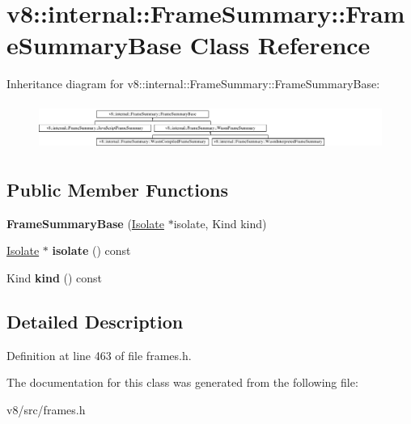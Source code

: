 \hypertarget{classv8_1_1internal_1_1FrameSummary_1_1FrameSummaryBase}{}\section{v8\+:\+:internal\+:\+:Frame\+Summary\+:\+:Frame\+Summary\+Base Class Reference}
\label{classv8_1_1internal_1_1FrameSummary_1_1FrameSummaryBase}
Inheritance diagram for v8\+:\+:internal\+:\+:Frame\+Summary\+:\+:Frame\+Summary\+Base\+:\begin{figure}[H]
\begin{center}
\leavevmode
\includegraphics[height=1.538462cm]{classv8_1_1internal_1_1FrameSummary_1_1FrameSummaryBase}
\end{center}
\end{figure}
\subsection*{Public Member Functions}
\begin{DoxyCompactItemize}
\item 
\mbox{\label{classv8_1_1internal_1_1FrameSummary_1_1FrameSummaryBase_a5120f48df9da94c2cf00e8b85fab47d6}} 
{\bfseries Frame\+Summary\+Base} (\mbox{\hyperlink{classv8_1_1internal_1_1Isolate}{Isolate}} $\ast$isolate, Kind kind)
\item 
\mbox{\label{classv8_1_1internal_1_1FrameSummary_1_1FrameSummaryBase_a779b6b7deb12c2cff191b260cc894a66}} 
\mbox{\hyperlink{classv8_1_1internal_1_1Isolate}{Isolate}} $\ast$ {\bfseries isolate} () const
\item 
\mbox{\label{classv8_1_1internal_1_1FrameSummary_1_1FrameSummaryBase_a0cd8449ef68fdf514ea0d2e0c29cf44d}} 
Kind {\bfseries kind} () const
\end{DoxyCompactItemize}


\subsection{Detailed Description}


Definition at line 463 of file frames.\+h.



The documentation for this class was generated from the following file\+:\begin{DoxyCompactItemize}
\item 
v8/src/frames.\+h\end{DoxyCompactItemize}
